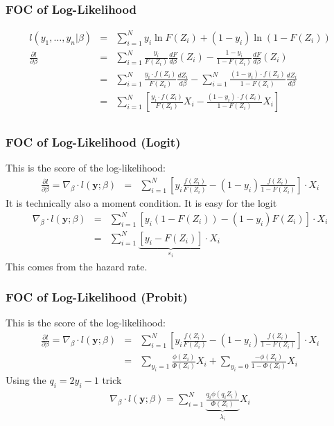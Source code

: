 \documentclass[aspectratio=169]{beamer}
\begin{document}
\begin{frame}
\frametitle{FOC of Log-Likelihood}
\begin{eqnarray*}
l(y_1,\ldots,y_n | \beta) &=& \sum_{i=1}^N y_i \ln F(Z_i) + (1-y_i) \ln(1- F(Z_i)) \\
\frac{\partial l }{\partial \beta} &=& \sum_{i=1}^N \frac{y_i}{ F(Z_i)} \frac{ d F}{d \beta}(Z_i) - \frac{1-y_i}{1-F(Z_i)}  \frac{ d F}{d \beta} (Z_i)\\
 &=& \sum_{i=1}^N \frac{y_i \cdot f(Z_i) }{ F(Z_i)} \frac{ d Z_i}{d \beta} -  \sum_{i=1}^N \frac{(1-y_i)\cdot f(Z_i) }{1-F(Z_i)} \frac{ d Z_i}{d \beta} \\
 &=& \sum_{i=1}^N  \left[ \frac{y_i \cdot f(Z_i) }{ F(Z_i)} X_i -  \frac{(1-y_i)\cdot f(Z_i) }{1-F(Z_i)} X_i \right] \\
\end{eqnarray*}
\end{frame}

\begin{frame}
\frametitle{FOC of Log-Likelihood (Logit)}
This is the \alert{score} of the log-likelihood:
\begin{eqnarray*}
\frac{\partial l }{\partial \beta} = \nabla_{\beta} \cdot l(\mathbf{y}; \beta) &=&  \sum_{i=1}^N  \left[ y_i \frac{ f(Z_i) }{ F(Z_i)}  -  (1-y_i) \frac{f(Z_i) }{1-F(Z_i)} \right]  \cdot X_i 
\end{eqnarray*}
It is technically also a \alert{moment condition}. It is easy for the logit
\begin{eqnarray*}
 \nabla_{\beta} \cdot l(\mathbf{y}; \beta) &=&  \sum_{i=1}^N  \left[ y_i (1-F(Z_i)) -  (1-y_i) F(Z_i) \right] \cdot X_i \\
 &=&  \sum_{i=1}^N  \underbrace{\left[ y_i - F(Z_i) \right]}_{\varepsilon_i} \cdot X_i 
\end{eqnarray*}
This comes from the hazard rate.
\end{frame}

\begin{frame}
\frametitle{FOC of Log-Likelihood (Probit)}
This is the \alert{score} of the log-likelihood:
\begin{eqnarray*}
\frac{\partial l }{\partial \beta} = \nabla_{\beta} \cdot l(\mathbf{y}; \beta) &=&  \sum_{i=1}^N  \left[ y_i \frac{ f(Z_i) }{ F(Z_i)}  -  (1-y_i) \frac{f(Z_i) }{1-F(Z_i)} \right] \cdot X_i  \\
 &=&  \sum_{y_i=1}  \frac{\phi(Z_i) }{ \Phi(Z_i)} X_i +\sum_{y_i=0} \frac{-\phi(Z_i) }{1-\Phi(Z_i)} X_i
\end{eqnarray*}
Using the $q_i = 2 y_i -1$ trick
\begin{eqnarray*}
\nabla_{\beta} \cdot l(\mathbf{y}; \beta)= \sum_{i=1}^N \underbrace{\frac{ q_i \phi(q_i Z_i)}{\Phi(Z_i)}}_{\lambda_i} X_i
\end{eqnarray*}
\end{frame}
\end{document}
